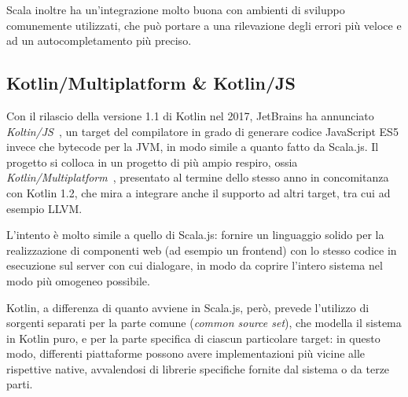       Scala inoltre ha un'integrazione molto buona con ambienti di sviluppo comunemente utilizzati, che può portare a una rilevazione degli errori più veloce e ad un autocompletamento più preciso.

    \subsection{Kotlin/Multiplatform \& Kotlin/JS}\label{subsec:kotlinjs}
      Con il rilascio della versione 1.1 di Kotlin nel 2017, JetBrains ha annunciato \emph{Koltin/JS}~\cite{Belov2017}, un target del compilatore in grado di generare codice JavaScript ES5 invece che bytecode per la JVM, in modo simile a quanto fatto da Scala.js.
      Il progetto si colloca in un progetto di più ampio respiro, ossia \emph{Kotlin/Multiplatform}~\cite{Jemerov2017}, presentato al termine dello stesso anno in concomitanza con Kotlin 1.2, che mira a integrare anche il supporto ad altri target, tra cui ad esempio LLVM\@.

      L'intento è molto simile a quello di Scala.js:
      fornire un linguaggio solido per la realizzazione di componenti web (ad esempio un frontend) con lo stesso codice in esecuzione sul server con cui dialogare, in modo da coprire l'intero sistema nel modo più omogeneo possibile.

      Kotlin, a differenza di quanto avviene in Scala.js, però, prevede l'utilizzo di sorgenti separati per la parte comune (\emph{common source set}), che modella il sistema in Kotlin puro, e per la parte specifica di ciascun particolare target:
      in questo modo, differenti piattaforme possono avere implementazioni più vicine alle rispettive native, avvalendosi di librerie specifiche fornite dal sistema o da terze parti.

